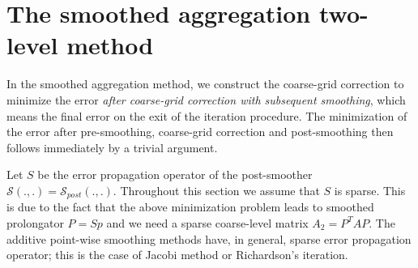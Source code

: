 \section{The smoothed aggregation two-level method}
In the smoothed aggregation method, we construct the coarse-grid
correction to minimize
the error {\em after coarse-grid correction with subsequent smoothing},
which means the final error on the exit of the iteration procedure.
The minimization of the error after pre-smoothing, coarse-grid correction
and post-smoothing then follows immediately by a trivial argument.

Let $S$ be the error propagation operator of the post-smoother
${\mathcal S}(.,.)={\mathcal S}_{post}(.,.)$.
Throughout this section we assume that $S$
is sparse. This is due to the fact that
the above minimization problem leads to smoothed prolongator
$P=Sp$
and we need a sparse coarse-level matrix $A_2=P^TAP$.
The additive point-wise smoothing methods have, in general, sparse
error propagation operator; this is the case of
Jacobi method or Richardson's iteration.

